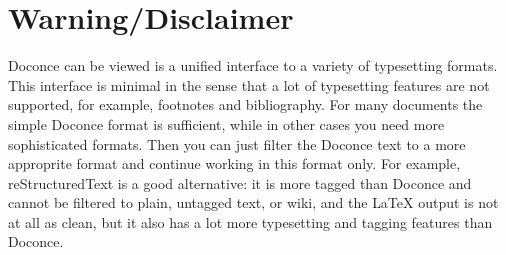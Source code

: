 \documentclass{article}
\begin{document}
\section{Warning/Disclaimer}

Doconce can be viewed is a unified interface to a variety of
typesetting formats.  This interface is minimal in the sense that a
lot of typesetting features are not supported, for example, footnotes
and bibliography. For many documents the simple Doconce format is
sufficient, while in other cases you need more sophisticated
formats. Then you can just filter the Doconce text to a more
approprite format and continue working in this format only.  For
example, reStructuredText is a good alternative: it is more tagged
than Doconce and cannot be filtered to plain, untagged text, or wiki,
and the {\LaTeX} output is not at all as clean, but it also has a lot
more typesetting and tagging features than Doconce.
\printindex
\end{document}
